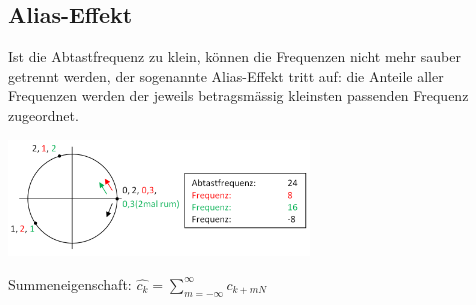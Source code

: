 	
	
	
\subsection{Alias-Effekt}

	Ist die Abtastfrequenz zu klein, k\"onnen die Frequenzen nicht mehr sauber getrennt werden, der sogenannte Alias-Effekt tritt auf:
	die Anteile aller Frequenzen werden der jeweils betragsm\"assig kleinsten passenden Frequenz zugeordnet.
	
	\begin{minipage}[c]{8.5cm}
		\includegraphics[width=8cm]{./bilder/Alias-effekt.png}
	\end{minipage}
	\begin{minipage}[c]{8cm}
		Summeneigenschaft: $\hat{c_k} = \sum\limits_{m=-\infty}^{\infty} c_{k+mN}$
	\end{minipage}
	
